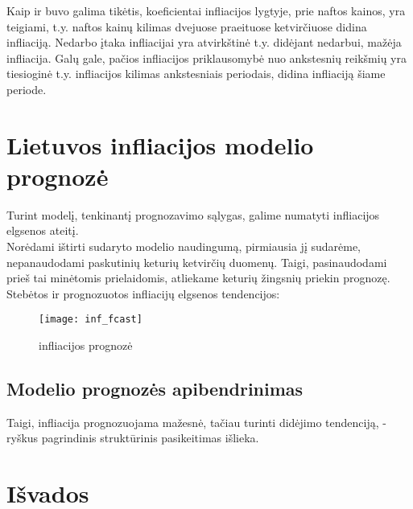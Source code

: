 \documentclass[a4paper]{article}
\begin{document}
Kaip ir buvo galima tikėtis, koeficientai infliacijos lygtyje, prie naftos kainos, yra teigiami, t.y. naftos kainų kilimas dvejuose praeituose ketvirčiuose didina infliaciją. Nedarbo įtaka infliacijai yra atvirkštinė t.y. didėjant nedarbui, mažėja infliacija. Galų gale, pačios infliacijos priklausomybė nuo ankstesnių reikšmių yra tiesioginė t.y. infliacijos kilimas ankstesniais periodais, didina infliaciją šiame periode.
\newpage
\section{Lietuvos infliacijos modelio prognozė}

Turint modelį, tenkinantį prognozavimo sąlygas, galime numatyti infliacijos elgsenos ateitį.\\
Norėdami ištirti sudaryto modelio naudingumą, pirmiausia jį sudarėme, nepanaudodami paskutinių keturių ketvirčių duomenų. Taigi, pasinaudodami prieš tai minėtomis prielaidomis, atliekame keturių žingsnių priekin prognozę.\\ Stebėtos ir prognozuotos infliacijų elgsenos tendencijos:

\begin{figure}[!h]
\centering
\texttt{[image: inf\_fcast]}
\caption{infliacijos prognozė}
\end{figure}

\subsection{Modelio prognozės apibendrinimas}
\noindent Taigi, infliacija prognozuojama mažesnė, tačiau turinti didėjimo tendenciją, - ryškus pagrindinis struktūrinis pasikeitimas išlieka.
\newpage
\section{Išvados}
\end{document}
